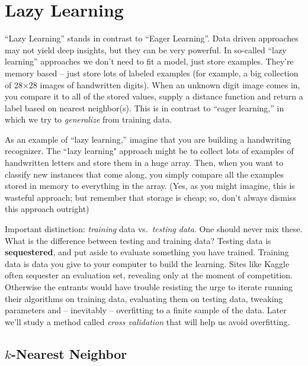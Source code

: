 \documentclass[a4paper]{article}
\begin{document}
\section{Lazy Learning}
``Lazy Learning'' stands in contrast to ``Eager Learning''. Data driven approaches may not yield deep insights, but they can be very powerful.  In so-called ``lazy learning'' approaches we don't need to fit a model, just store examples.  They're memory based -- just store lots of labeled examples (for example, a big collection of 28$\times$28 images of handwritten digits). When an unknown digit image comes in, you compare it to all of the stored values, supply a distance function and return a label based on nearest neighbor(s).  This is in contrast to ``eager learning,'' in which we try to \emph{generalize} from training data.

As an example of ``lazy learning,'' imagine that you are building a handwriting recognizer. The ``lazy learning" approach might be to collect lots of examples of handwritten letters and store them in a huge array. Then, when you want to classify new instances that come along, you simply compare all the examples stored in memory to everything in the array. (Yes, as you might imagine, this is wasteful approach; but remember that storage is cheap; so, don't always dismiss this approach outright)

Important distinction: \emph{training} data vs.\ \emph{testing data}.  One should never mix these. What is the difference between testing and training data? Testing data is \textbf{sequestered}, and put aside to evaluate something you have trained. Training data is data you give to your computer to build the learning. Sites like Kaggle often sequester an evaluation set, revealing only at the moment of competition.  Otherwise the entrants would have trouble resisting the urge to iterate running their algorithms on training data, evaluating them on testing data, tweaking parameters and -- inevitably -- overfitting to a finite sample of the data.  Later we'll study a method called \emph{cross validation} that will help us avoid overfitting.

\subsection{$k$-Nearest Neighbor}
\end{document}
